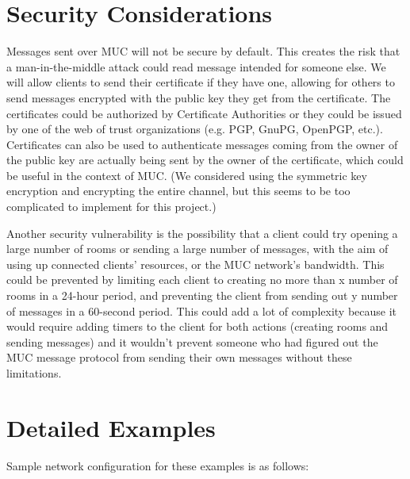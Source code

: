 \documentclass{article}
\begin{document}
\section{Security Considerations}

Messages sent over MUC will not be secure by default. This creates the risk that
a man-in-the-middle attack could read message intended for someone else.  We
will allow clients to send their certificate if they have one, allowing for
others to send messages encrypted with the public key they get from the
certificate. The certificates could be authorized by Certificate Authorities or
they could be issued by one of the web of trust organizations (e.g. PGP, GnuPG,
OpenPGP, etc.). Certificates can also be used to authenticate messages coming
from the owner of the public key are actually being sent by the owner of the
certificate, which could be useful in the context of MUC.  (We considered using
the symmetric key encryption and encrypting the entire channel, but this seems
to be too complicated to implement for this project.)

Another security vulnerability is the possibility that a client could try
opening a large number of rooms or sending a large number of messages, with the
aim of using up connected clients' resources, or the MUC network's bandwidth.
This could be prevented by limiting each client to creating no more than x
number of rooms in a 24-hour period, and preventing the client from sending out
y number of messages in a 60-second period.  This could add a lot of complexity
because it would require adding timers to the client for both actions (creating
rooms and sending messages) and it wouldn't prevent someone who had figured out
the MUC message protocol from sending their own messages without these
limitations.

\section{Detailed Examples}

Sample network configuration for these examples is as follows:

\begin{center}
\end{center}
\end{document}
